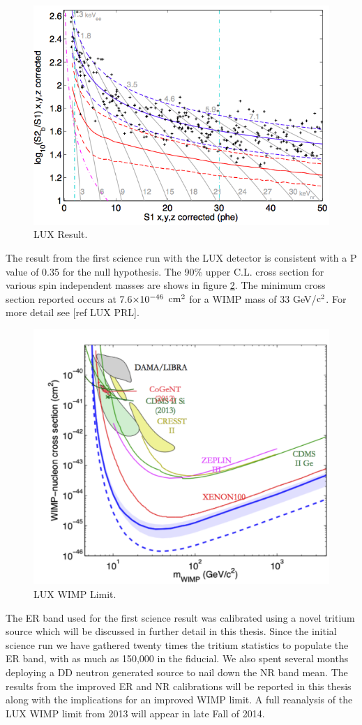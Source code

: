  \begin{figure}[h!]\centering
\includegraphics[width=120mm]{Chapter_LUX_Det/LUX_Result.png}
\caption{LUX Result.}
\label{fig:LUX_Result}
\end{figure}

The result from the first science run with the LUX detector is consistent with a P value of 0.35 for the null hypothesis. The 90\% upper C.L. cross section for various spin independent masses are shows in figure \ref{fig:LUX_Limit}. The minimum cross section reported occurs at 7.6$\rm\times10^{-46}$ $\rm cm^2$ for a WIMP mass of 33 GeV/$\rm c^2$. For more detail see [ref LUX PRL].

 \begin{figure}[h!]\centering
\includegraphics[width=120mm]{Chapter_LUX_Det/LUX_Limit.png}
\caption{LUX WIMP Limit.}
\label{fig:LUX_Limit}
\end{figure}


The ER band used for the first science result was calibrated using a novel tritium source which will be discussed in further detail in this thesis. Since the initial science run we have gathered twenty times the tritium statistics to populate the ER band, with as much as 150,000 in the fiducial. We also spent several months deploying a DD neutron generated source to nail down the NR band mean. The results from the improved ER and NR calibrations will be reported in this thesis along with the implications for an improved WIMP limit. A full reanalysis of the LUX WIMP limit from 2013 will appear in late Fall of 2014. 
